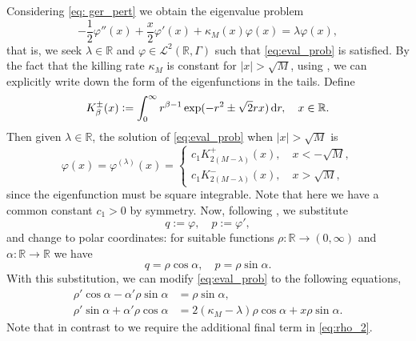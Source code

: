 \documentclass{aptpub}
\newcommand{\R}{\mathbb R}
\begin{document}
Considering \eqref{eq: ger_pert} we obtain the eigenvalue problem
\begin{equation}
    -\frac{1}{2}\varphi''(x) + \frac{x}{2} \varphi'(x) + \kappa_M(x) \varphi(x) = \lambda \varphi(x),
    \label{eq:eval_prob}
\end{equation}
that is, we seek $\lambda\in\R$ and $\varphi\in\mathcal{L}^2(\R,\Gamma)$ such that \eqref{eq:eval_prob} is satisfied. 
By the fact that the killing rate $\kappa_M$ is constant for $|x|>\sqrt M$, using \cite{Taylor1989}, we can explicitly write down the form of the eigenfunctions in the tails. Define
\begin{equation*}
     K_\beta^\pm(x) := \int_0^\infty r^{\beta -1} \exp(-r^2 \pm \sqrt 2 rx) \dif r, \quad x \in \R.
\end{equation*}
Then given $\lambda\in\R$, the solution of \eqref{eq:eval_prob} when $|x|>\sqrt M$ is
\begin{equation}
    \varphi(x) = \varphi^{(\lambda)} (x) = 
    \begin{cases}
        c_1 K_{2(M-\lambda)}^+(x), \quad x< -\sqrt M, \\
        c_1 K_{2(M-\lambda)}^- (x),\quad x> \sqrt M,
    \end{cases}
    \label{eq:varphi_tails}
\end{equation}
since the eigenfunction must be square integrable. Note that here we have a common constant $c_1>0$ by symmetry. 
Now, following \cite{Mielnik1996}, we  substitute
\begin{equation*}
    q:= \varphi ,\quad p:= \varphi',
\end{equation*}
and change to polar coordinates: for suitable functions $\rho\colon\R\to(0,\infty)$ and $\alpha\colon\R \to \R$ we have
\begin{equation*}
    q=\rho \cos \alpha ,\quad p = \rho \sin \alpha.
\end{equation*}
With this substitution, we can modify \eqref{eq:eval_prob} to the following equations,
\begin{align}
        \rho' \cos \alpha -  \alpha' \rho \sin \alpha &= \rho \sin \alpha ,\label{eq:rho_1}\\ 
        \rho' \sin \alpha + \alpha' \rho \cos \alpha &=2(\kappa_M-\lambda) \rho \cos \alpha + x \rho \sin\alpha \label{eq:rho_2}.
\end{align}
Note that in contrast to \cite[(17)]{Mielnik1996} we require the additional final term in \eqref{eq:rho_2}.
\end{document}
